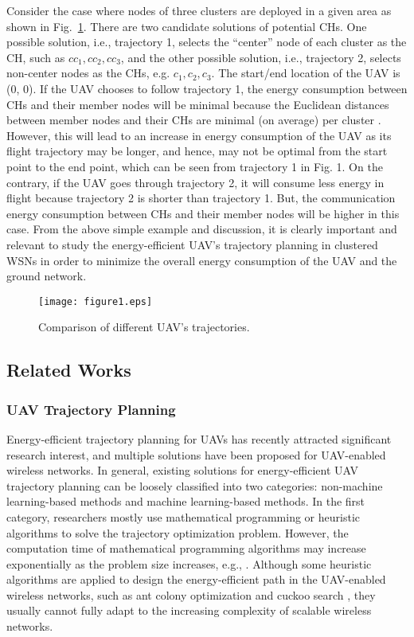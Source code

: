 \documentclass[journal]{IEEEtran}
\begin{document}
Consider the case where nodes of three clusters are deployed in a given area as shown in Fig.~\ref{figure1}. There are two candidate solutions of potential CHs. One possible solution, i.e., trajectory 1, selects the ``center'' node of each cluster as the CH, such as $cc_1, cc_2, cc_3$, and the other possible solution, i.e., trajectory 2, selects non-center nodes as the CHs, e.g. $c_1, c_2, c_3$.	The start/end location of the UAV is (0, 0). If the UAV chooses to follow trajectory 1, the energy consumption between CHs and their member nodes will be minimal because the Euclidean distances between member nodes and their CHs are minimal (on average) per cluster \cite{B. Zhu}. However, this will lead to an increase in energy consumption of the UAV as its flight trajectory may be longer, and hence, may not be optimal from the start point to the end point, which can be seen from trajectory 1 in Fig. 1. On the contrary, if the UAV goes through trajectory 2, it will consume less energy in flight because trajectory 2 is shorter than trajectory 1. But, the communication energy consumption between CHs and their member nodes will be higher in this case. From the above simple example and discussion, it is clearly important and relevant to study the energy-efficient UAV's trajectory planning in clustered WSNs in order to minimize the overall energy consumption of the UAV and the ground network.
	
	
	\begin{figure}[t]
		\centering
		\texttt{[image: figure1.eps]}
		\caption{Comparison of different UAV's trajectories.}
		\label{figure1}
	\end{figure}
	
	
	\subsection{Related Works}
	\subsubsection{UAV Trajectory Planning}
	
Energy-efficient trajectory planning for UAVs has recently attracted significant research interest, and multiple solutions have been proposed for UAV-enabled wireless networks. In general, existing solutions for energy-efficient UAV trajectory planning can be loosely classified into two categories: non-machine learning-based methods and machine learning-based methods. In the first category, researchers mostly use mathematical programming or heuristic algorithms to solve the trajectory optimization problem. However, the computation time of mathematical programming algorithms may increase exponentially as the problem size increases, e.g., \cite{M. Samir, S. Zhang}. Although some heuristic algorithms are applied to design the energy-efficient path in the UAV-enabled wireless networks, such as ant colony optimization \cite{A. A. Al-Habob} and cuckoo search \cite{K. Zhu}, they usually cannot fully adapt to the increasing complexity of scalable wireless networks.
\end{document}
